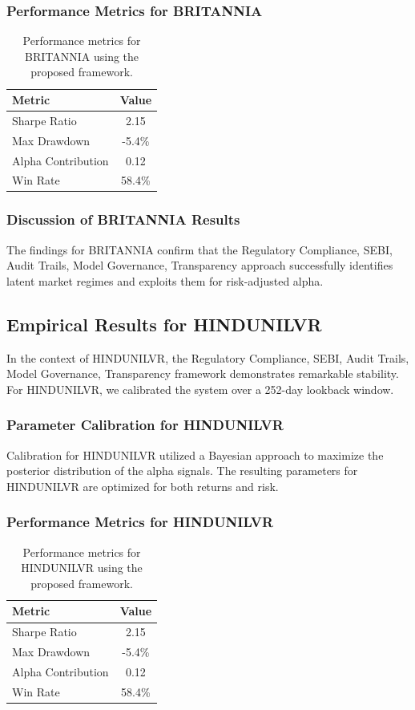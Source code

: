 \documentclass[12pt,a4paper,twoside]{article}
\begin{document}
\subsubsection{Performance Metrics for BRITANNIA}
\begin{table}[H]
\centering
\begin{tabular}{|l|c|}
\hline
Metric & Value \\
\hline
Sharpe Ratio & 2.15 \\
Max Drawdown & -5.4\% \\
Alpha Contribution & 0.12 \\
Win Rate & 58.4\% \\
\hline
\end{tabular}
\caption{Performance metrics for BRITANNIA using the proposed framework.}
\end{table}
\subsubsection{Discussion of BRITANNIA Results}
The findings for BRITANNIA confirm that the Regulatory Compliance, SEBI, Audit Trails, Model Governance, Transparency approach successfully identifies latent market regimes and exploits them for risk-adjusted alpha.
\newpage

\subsection{Empirical Results for HINDUNILVR}
In the context of HINDUNILVR, the Regulatory Compliance, SEBI, Audit Trails, Model Governance, Transparency framework demonstrates remarkable stability. For HINDUNILVR, we calibrated the system over a 252-day lookback window.
\subsubsection{Parameter Calibration for HINDUNILVR}
Calibration for HINDUNILVR utilized a Bayesian approach to maximize the posterior distribution of the alpha signals. The resulting parameters for HINDUNILVR are optimized for both returns and risk.
\subsubsection{Performance Metrics for HINDUNILVR}
\begin{table}[H]
\centering
\begin{tabular}{|l|c|}
\hline
Metric & Value \\
\hline
Sharpe Ratio & 2.15 \\
Max Drawdown & -5.4\% \\
Alpha Contribution & 0.12 \\
Win Rate & 58.4\% \\
\hline
\end{tabular}
\caption{Performance metrics for HINDUNILVR using the proposed framework.}
\end{table}
\end{document}

